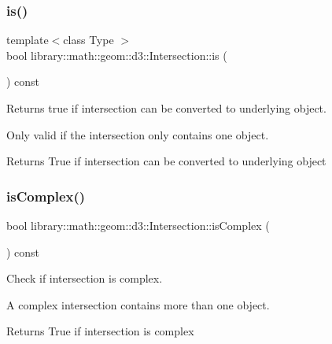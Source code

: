 \subsubsection{\texorpdfstring{is()}{is()}}
{\footnotesize\ttfamily template$<$class Type $>$ \\
bool library\+::math\+::geom\+::d3\+::\+Intersection\+::is (\begin{DoxyParamCaption}{ }\end{DoxyParamCaption}) const\hspace{0.3cm}{\ttfamily [inline]}}



Returns true if intersection can be converted to underlying object. 

Only valid if the intersection only contains one object.

\begin{DoxyReturn}{Returns}
True if intersection can be converted to underlying object 
\end{DoxyReturn}
\mbox{\label{classlibrary_1_1math_1_1geom_1_1d3_1_1_intersection_a9d36aae5ad591dfc94b76c7880f7d8af}} 
\subsubsection{\texorpdfstring{is\+Complex()}{isComplex()}}
{\footnotesize\ttfamily bool library\+::math\+::geom\+::d3\+::\+Intersection\+::is\+Complex (\begin{DoxyParamCaption}{ }\end{DoxyParamCaption}) const}



Check if intersection is complex. 

A complex intersection contains more than one object.

\begin{DoxyReturn}{Returns}
True if intersection is complex 
\end{DoxyReturn}
\mbox{\label{classlibrary_1_1math_1_1geom_1_1d3_1_1_intersection_a746fc547529ce91a99412597eb5ae559}} 
